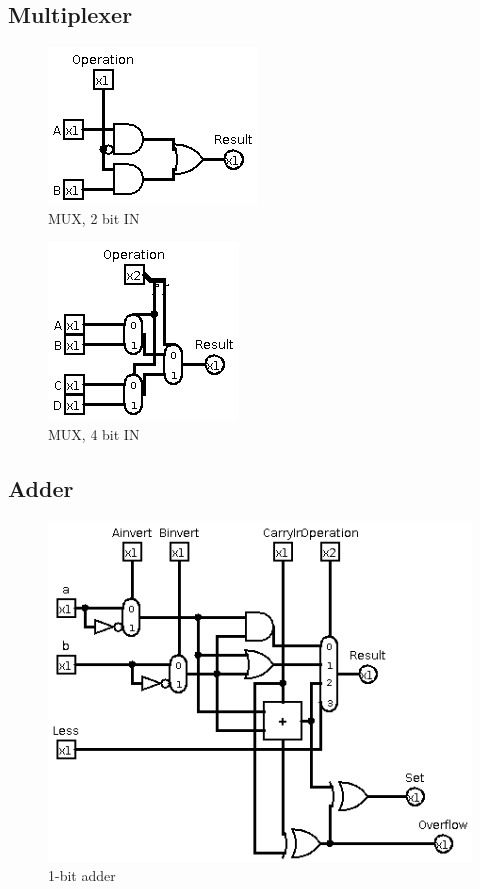 \documentclass[10pt,a4paper,danish]{article}
\begin{document}
\subsection{Multiplexer}

\begin{figure}[htb]
\begin{center}
\leavevmode
\includegraphics[scale=0.70]{mux-2bit.png}
\end{center}
\caption{MUX, 2 bit IN}
\label{fig:mux2bit} 
\end{figure}

\begin{figure}[htb]
\begin{center}
\leavevmode
\includegraphics[scale=0.70]{mux-4bit.png}
\end{center}
\caption{MUX, 4 bit IN}
\label{fig:mux4bit} 
\end{figure}

\subsection{Adder}
\begin{figure}[htb]
\begin{center}
\leavevmode
\includegraphics[scale=0.70]{adder-1bit.png}
\end{center}
\caption{1-bit adder}
\label{fig:adder}
\end{figure}
\end{document}
